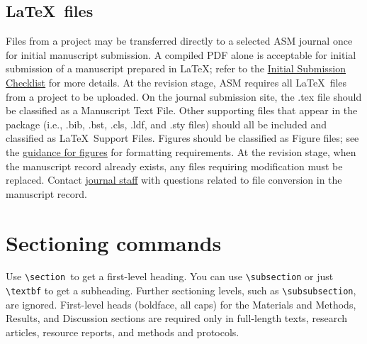 \documentclass{asmarticle}
\begin{document}
\subsection{\LaTeX\ files}
	Files from a project may be transferred directly to a selected ASM journal once for initial manuscript submission. A compiled PDF alone is acceptable for initial submission of a manuscript prepared in \LaTeX; refer to the \href{https://journals.asm.org/initial-submission-checklist}{\underline{Initial Submission Checklist}} for more details. At the revision stage, ASM requires all \LaTeX\ files from a project to be uploaded. On the journal submission site, the .tex file should be classified as a Manuscript Text File. Other supporting files that appear in the package (i.e., .bib, .bst, .cls, .ldf, and .sty files) should all be included and classified as \LaTeX\ Support Files. Figures should be classified as Figure files; see the \href{https://journals.asm.org/figures-tables}{\underline{guidance for figures}} for formatting requirements. At the revision stage, when the manuscript record already exists, any files requiring modification must be replaced. Contact \href{https://journals.asm.org/contact-us}{\underline{journal staff}} with questions related to file conversion in the manuscript record.

\section{Sectioning commands}
	Use \verb|\section|\ to get a first-level heading. You can use \verb|\subsection| or just \verb|\textbf| to get a subheading. Further sectioning levels, such as \verb|\subsubsection|, are ignored. First-level heads (boldface, all caps) for the Materials and Methods, Results, and Discussion sections are required only in full-length texts, research articles, resource reports, and methods and protocols. 
\end{document}
